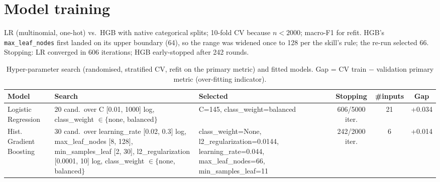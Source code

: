 \documentclass[10pt]{article}
\begin{document}
\section{Model training}
LR (multinomial, one-hot) vs.\ HGB with native categorical splits; 10-fold CV because $n<2000$; macro-F1 for refit. HGB's \texttt{max\_leaf\_nodes} first landed on its upper boundary (64), so the range was widened once to 128 per the skill's rule; the re-run selected 66. Stopping: LR converged in 606 iterations; HGB early-stopped after 242 rounds. \begin{table}[!htb]\centering\footnotesize\setlength{\tabcolsep}{3pt}
\caption{Hyper-parameter search (randomised, stratified CV, refit on the primary metric) and fitted models. Gap = CV train $-$ validation primary metric (over-fitting indicator).}\label{tab:config}
\begin{tabularx}{\linewidth}{l Y Y c c c}\toprule
Model & Search & Selected & Stopping & \#inputs & Gap\\\midrule
Logistic Regression & 20 cand.\ over C [0.01, 1000] log, class\_weight $\in\{$none, balanced$\}$ & C=145, class\_weight=balanced & 606/5000 iter. & 21 & +0.034\\
Hist. Gradient Boosting & 30 cand.\ over learning\_rate [0.02, 0.3] log, max\_leaf\_nodes [8, 128], min\_samples\_leaf [2, 30], l2\_regularization [0.0001, 10] log, class\_weight $\in\{$none, balanced$\}$ & class\_weight=None, l2\_regularization=0.0144, learning\_rate=0.044, max\_leaf\_nodes=66, min\_samples\_leaf=11 & 242/2000 iter. & 6 & +0.014\\
\bottomrule\end{tabularx}\end{table}
\end{document}
